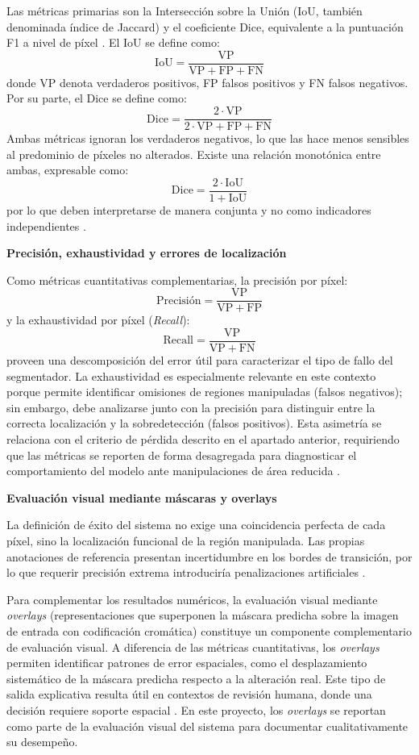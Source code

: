 Las métricas primarias son la Intersección sobre la Unión (IoU, también denominada índice de Jaccard) \parencite{jaccard1912distribution} y el coeficiente Dice, equivalente a la puntuación F1 a nivel de píxel \parencite{Seghier2024}. El IoU se define como:
\[
\mathrm{IoU}=\frac{\mathrm{VP}}{\mathrm{VP}+\mathrm{FP}+\mathrm{FN}}
\]
donde VP denota verdaderos positivos, FP falsos positivos y FN falsos negativos. Por su parte, el Dice se define como:
\[
\mathrm{Dice}=\frac{2\cdot\mathrm{VP}}{2\cdot\mathrm{VP}+\mathrm{FP}+\mathrm{FN}}
\]
Ambas métricas ignoran los verdaderos negativos, lo que las hace menos sensibles al predominio de píxeles no alterados. Existe una relación monotónica entre ambas, expresable como:
\[
\mathrm{Dice}=\frac{2\cdot\mathrm{IoU}}{1+\mathrm{IoU}}
\]
por lo que deben interpretarse de manera conjunta y no como indicadores independientes \parencite{Azad2023, Seghier2024}.

\medskip\textbf{Precisión, exhaustividad y errores de localización}

Como métricas cuantitativas complementarias, la precisión por píxel:
\[
\text{Precisión} = \frac{\mathrm{VP}}{\mathrm{VP} + \mathrm{FP}}
\]
y la exhaustividad por píxel (\textit{Recall}):
\[
\text{Recall} = \frac{\mathrm{VP}}{\mathrm{VP} + \mathrm{FN}}
\]
proveen una descomposición del error útil para caracterizar el tipo de fallo del segmentador. La exhaustividad es especialmente relevante en este contexto porque permite identificar omisiones de regiones manipuladas (falsos negativos); sin embargo, debe analizarse junto con la precisión para distinguir entre la correcta localización y la sobredetección (falsos positivos). Esta asimetría se relaciona con el criterio de pérdida descrito en el apartado anterior, requiriendo que las métricas se reporten de forma desagregada para diagnosticar el comportamiento del modelo ante manipulaciones de área reducida \parencite{Li2025, Hu2024}.

\medskip\textbf{Evaluación visual mediante máscaras y overlays}

La definición de éxito del sistema no exige una coincidencia perfecta de cada píxel, sino la localización funcional de la región manipulada. Las propias anotaciones de referencia presentan incertidumbre en los bordes de transición, por lo que requerir precisión extrema introduciría penalizaciones artificiales \parencite{Li2025, Xu2024}. 

Para complementar los resultados numéricos, la evaluación visual mediante \textit{overlays} (representaciones que superponen la máscara predicha sobre la imagen de entrada con codificación cromática) constituye un componente complementario de evaluación visual. A diferencia de las métricas cuantitativas, los \textit{overlays} permiten identificar patrones de error espaciales, como el desplazamiento sistemático de la máscara predicha respecto a la alteración real. Este tipo de salida explicativa resulta útil en contextos de revisión humana, donde una decisión requiere soporte espacial \parencite{Amerini2025, Xu2024, Miao2025}. En este proyecto, los \textit{overlays} se reportan como parte de la evaluación visual del sistema para documentar cualitativamente su desempeño.

